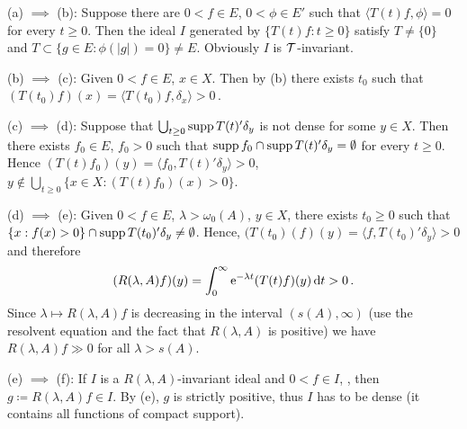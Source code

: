 (a) $\implies$ (b): Suppose there are $0 < f \in E$, $0 < \phi \in E'$ such that $\langle T(t)f,\phi \rangle = 0$ for every $t \geq 0$.
Then the ideal $I$ generated by $\{T(t)f : t \geq 0\}$ satisfy $T \neq \{0\}$  and  $T \subset \{g \in E : \phi(|g|) = 0\} \neq E$.
Obviously $I$ is $\mathcal{T}$-invariant.

(b) $\implies$ (c): Given $0 < f \in E$, $x \in X$.
Then by (b) there exists $t_{0}$ such that $(T(t_{0})f)(x) = \langle T(t_{0})f,\delta_{x} \rangle > 0$\,.

(c) $\implies$ (d): Suppose that $\bigcup_{t \geq 0}\mathop{}\!\mathrm{supp}\, T(t)'\delta_{y}$ is not dense for some $y \in X$.
Then there exists $f_{0} \in E$, $f_{0} > 0$ such that
$\mathop{}\!\mathrm{supp}\, f_{0} \cap \mathop{}\!\mathrm{supp}\, T(t)'\delta_{y} = \emptyset$ for every $t \geq 0$.
Hence $(T(t)f_{0})(y) = \langle f_{0},T(t)'\delta_{y} \rangle > 0$, \ie $y \notin \bigcup_{t\geq 0}\{x \in X : (T(t)f_{0})(x) > 0\}$.

(d) $\implies$ (e): Given $0 < f \in E$, $\lambda > \omega_{0}(A)$, $y \in X$, there exists $t_{0} \geq 0$ such that $\{x : f(x) > 0\} \cap \mathop{}\!\mathrm{supp}\, T(t_{0})'\delta_{y} \neq \emptyset$.
Hence, $(T(t_{0})(f)(y) = \langle f,T(t_{0})'\delta_{y} \rangle > 0$ and therefore
\[
(R(\lambda,A)f)(y) = \int_{0}^{\infty} \mathrm{e}^{-\lambda t}(T(t)f)(y) \mathop{}\!\mathrm{d}{t} > 0\,.
\]
Since $\lambda \mapsto R(\lambda,A)f$ is decreasing in the interval $(s(A),\infty)$ (use the resolvent equation and the fact that $R(\lambda,A)$ is positive) we have $R(\lambda,A)f \gg 0$ for all $\lambda > s(A)$.

(e) $\implies$ (f): If $I$ is a $R(\lambda,A)$-invariant ideal and 0$ < f \in I$, , then $g \coloneqq R(\lambda,A)f \in I$. 
By (e), $g$ is strictly positive, thus $I$ has to be dense (it contains all functions of compact support). 

